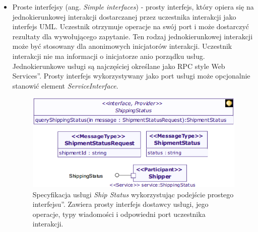 \begin{itemize}
\item{Proste interfejsy (ang. \emph{Simple interfaces}) - prosty interfejs, który opiera się na jednokierunkowej interakcji dostarczanej przez uczestnika interakcji jako interfejs UML. Uczestnik otrzymuje operacje na swój port i może dostarczyć rezultaty dla wywołującego zapytanie. Ten rodzaj jednokierunkowej interakcji może być stosowany dla anonimowych inicjatorów interakcji. Uczestnik interakcji nie ma informacji o inicjatorze anio  porządku usług. Jednokierunkowe usługi są najczęściej określane jako \quotedblbase RPC style Web Services\textquotedblright. Prosty interfejs wykorzystywany jako port usługi może opcjonalnie stanowić element \emph{ServiceInterface}.} \cite{SOAMLOMG}

\begin{figure}[h!tbp]
\begin{centering}
\includegraphics[width=11cm]{img/simple_interface_based_approach.png}
\caption[Specyfikacja usługi \emph{Ship Status} wykorzystując podejście \quotedblbase prostego interfejsu\textquotedblright. Zawiera prosty interfejs dostawcy usługi, jego operacje, typy wiadomości i odpowiedni port uczestnika interakcji.]{Specyfikacja usługi \emph{Ship Status} wykorzystując podejście \quotedblbase prostego interfejsu\textquotedblright. Zawiera prosty interfejs dostawcy usługi, jego operacje, typy wiadomości i odpowiedni port uczestnika interakcji.\cite{SoaMLErvBase}}\label{simple_interface_based_approach}
\end{centering}
\end{figure}


\end{itemize}
